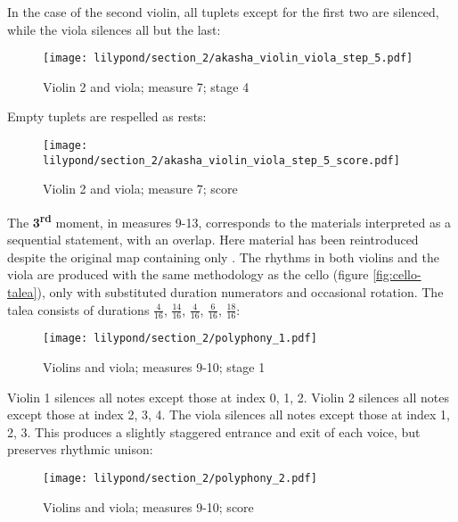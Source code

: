 In the case of the second violin, all tuplets except for the first two are silenced, while the viola silences all but the last:

\setcounter{figure}{7}
\setcounter{subFigure}{4}
\begin{figure}[H]
    \texttt{[image: lilypond/section\_2/akasha\_violin\_viola\_step\_5.pdf]}
    \caption{Violin 2 and viola; measure 7; stage 4}
    \label{fig:violin-viola-talea-5}
\end{figure}

Empty tuplets are respelled as rests:

\setcounter{figure}{7}
\setcounter{subFigure}{5}
\begin{figure}[H]
    \texttt{[image: lilypond/section\_2/akasha\_violin\_viola\_step\_5\_score.pdf]}
    \caption{Violin 2 and viola; measure 7; score}
    \label{fig:violin-viola-talea-5-score}
\end{figure}

The \textbf{3\textsuperscript{rd}} moment, in measures 9-13, corresponds to the materials  interpreted as a sequential statement, with an overlap. Here material  has been reintroduced despite the original map containing only . The  rhythms in both violins and the viola are produced with the same methodology as the cello (figure \ref{fig:cello-talea}), only with substituted duration numerators and occasional rotation. The talea consists of durations $\frac{4}{16}$, $\frac{14}{16}$, $\frac{4}{16}$, $\frac{6}{16}$, $\frac{18}{16}$:

\setcounter{figure}{8}
\setcounter{subFigure}{1}
\begin{figure}[H]
    \texttt{[image: lilypond/section\_2/polyphony\_1.pdf]}
    \caption{Violins and viola; measures 9-10; stage 1}
    \label{fig:polyphony-talea-1}
\end{figure}

Violin 1 silences all notes except those at index 0, 1, 2. Violin 2 silences all notes except those at index 2, 3, 4. The viola silences all notes except those at index 1, 2, 3. This produces a slightly staggered entrance and exit of each voice, but preserves rhythmic unison:

\setcounter{figure}{8}
\setcounter{subFigure}{2}
\begin{figure}[H]
    \texttt{[image: lilypond/section\_2/polyphony\_2.pdf]}
    \caption{Violins and viola; measures 9-10; score}
    \label{fig:polyphony-talea-2}
\end{figure}


